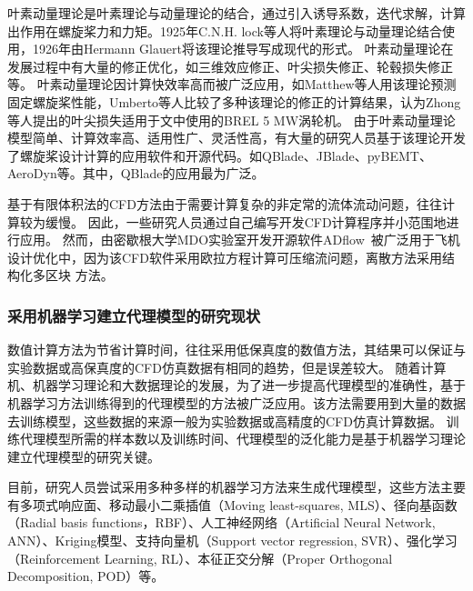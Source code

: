 叶素动量理论是叶素理论与动量理论的结合，通过引入诱导系数，迭代求解，计算出作用在螺旋桨力和力矩。1925年C.N.H. lock等人将叶素理论与动量理论结合使用，1926年由Hermann Glauert将该理论推导写成现代的形式。
叶素动量理论在发展过程中有大量的修正优化，如三维效应修正、叶尖损失修正、轮毂损失修正等。
叶素动量理论因计算快效率高而被广泛应用，如Matthew等人\cite{McCrink2017}用该理论预测固定螺旋桨性能，Umberto等人\cite{Boatto2023}比较了多种该理论的修正的计算结果，认为Zhong等人\cite{Zhong2020}提出的叶尖损失适用于文中使用的BREL 5 MW涡轮机。
由于叶素动量理论模型简单、计算效率高、适用性广、灵活性高，有大量的研究人员基于该理论开发了螺旋桨设计计算的应用软件和开源代码。如QBlade\cite{Marten2013QBLADEA}、JBlade\cite{Silvestre2013}、pyBEMT\cite{Giljarhus2020pyBEMT}、AeroDyn等。其中，QBlade的应用最为广泛\cite{Turbak2023, Vyom2022, Fernandez2023,Panjwani2020}。

基于有限体积法的CFD方法由于需要计算复杂的非定常的流体流动问题，往往计算较为缓慢。
因此，一些研究人员通过自己编写开发CFD计算程序并小范围地进行应用\cite{Wu2022, Shahrokhi2007}。
然而，由密歇根大学MDO实验室开发开源软件ADflow~\cite{Mader2020}被广泛用于飞机设计优化中\cite{Chauhan2021,Scco2021,Li2021}，因为该CFD软件采用欧拉方程计算可压缩流问题，离散方法采用结构化多区块
方法。

\vspace{0.8em}
\subsubsection{采用机器学习建立代理模型的研究现状}\label{Sec: surrogate model}
\vspace{0.8em}

数值计算方法为节省计算时间，往往采用低保真度的数值方法，其结果可以保证与实验数据或高保真度的CFD仿真数据有相同的趋势，但是误差较大。
随着计算机、机器学习理论和大数据理论的发展，为了进一步提高代理模型的准确性，基于机器学习方法训练得到的代理模型的方法被广泛应用。该方法需要用到大量的数据去训练模型，这些数据的来源一般为实验数据或高精度的CFD仿真计算数据。
训练代理模型所需的样本数以及训练时间、代理模型的泛化能力是基于机器学习理论建立代理模型的研究关键。

目前，研究人员尝试采用多种多样的机器学习方法来生成代理模型，这些方法主要有多项式响应面\cite{Ahn2001, Xiong2006}、移动最小二乘插值（Moving least-squares, MLS）\cite{Toropov2005}、径向基函数（Radial basis functions，RBF）\cite{Asouti2023}、人工神经网络（Artificial Neural Network, ANN）\cite{Liu2023,Jahangirian2011,Han2017, Zan2022}、Kriging模型\cite{Jouhaud2007,LiJichao2020,Wu2022}、支持向量机（Support vector regression, SVR）\cite{Andres2012}、强化学习（Reinforcement Learning, RL）\cite{Chen2023}、本征正交分解（Proper Orthogonal Decomposition, POD）\cite{Iuliano2013,Grey2018,LiJichao2019}等。

